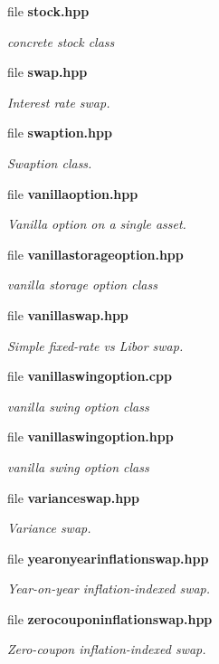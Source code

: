 \begin{DoxyCompactItemize}
file {\bf stock.\+hpp}
\begin{DoxyCompactList}\small\item\em concrete stock class \end{DoxyCompactList}\item 
file {\bf swap.\+hpp}
\begin{DoxyCompactList}\small\item\em Interest rate swap. \end{DoxyCompactList}\item 
file {\bf swaption.\+hpp}
\begin{DoxyCompactList}\small\item\em Swaption class. \end{DoxyCompactList}\item 
file {\bf vanillaoption.\+hpp}
\begin{DoxyCompactList}\small\item\em Vanilla option on a single asset. \end{DoxyCompactList}\item 
file {\bf vanillastorageoption.\+hpp}
\begin{DoxyCompactList}\small\item\em vanilla storage option class \end{DoxyCompactList}\item 
file {\bf vanillaswap.\+hpp}
\begin{DoxyCompactList}\small\item\em Simple fixed-\/rate vs Libor swap. \end{DoxyCompactList}\item 
file {\bf vanillaswingoption.\+cpp}
\begin{DoxyCompactList}\small\item\em vanilla swing option class \end{DoxyCompactList}\item 
file {\bf vanillaswingoption.\+hpp}
\begin{DoxyCompactList}\small\item\em vanilla swing option class \end{DoxyCompactList}\item 
file {\bf varianceswap.\+hpp}
\begin{DoxyCompactList}\small\item\em Variance swap. \end{DoxyCompactList}\item 
file {\bf yearonyearinflationswap.\+hpp}
\begin{DoxyCompactList}\small\item\em Year-\/on-\/year inflation-\/indexed swap. \end{DoxyCompactList}\item 
file {\bf zerocouponinflationswap.\+hpp}
\begin{DoxyCompactList}\small\item\em Zero-\/coupon inflation-\/indexed swap. \end{DoxyCompactList}\end{DoxyCompactItemize}
